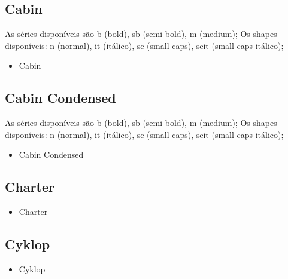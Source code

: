 
    \subsection{Cabin}
    As séries disponíveis são b (bold), sb (semi bold), m (medium);
    Os shapes disponíveis: n (normal), it (itálico), sc (small caps), scit (small caps itálico);
    \begin{itemize}
         \item {\selectfont Cabin}
    \end{itemize}


    \subsection{Cabin Condensed}
    As séries disponíveis são b (bold), sb (semi bold), m (medium);
    Os shapes disponíveis: n (normal), it (itálico), sc (small caps), scit (small caps itálico);
    \begin{itemize}
        \item {\selectfont Cabin Condensed}
    \end{itemize}


    \subsection{Charter}
    \begin{itemize}
        \item {\selectfont Charter}
    \end{itemize}


    \subsection{Cyklop}
    \begin{itemize}
        \item {\selectfont Cyklop}
    \end{itemize}


